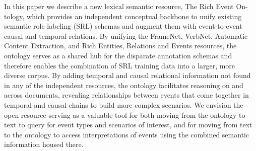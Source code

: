 In this paper we describe a new lexical semantic resource, The Rich Event On-tology, which provides an independent conceptual backbone to unify existing semantic role labeling (SRL) schemas and augment them with event-to-event causal and temporal relations.        By unifying the FrameNet, VerbNet, Automatic Content Extraction, and Rich Entities, Relations and Events resources, the ontology serves as a shared hub for the disparate annotation schemas and therefore enables the combination of SRL training data into a larger, more diverse corpus.  By adding temporal and causal relational information not found in any of the independent resources, the ontology facilitates reasoning on and across documents, revealing relationships between events that come together in temporal and causal chains to build more complex scenarios.  We envision the open resource serving as a valuable tool for both moving from the ontology to text to query for event types and scenarios of interest, and for moving from text to the ontology to access interpretations of events using the combined semantic information housed there.
